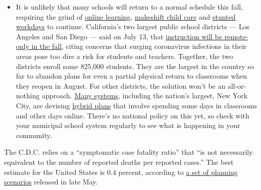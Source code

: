 \begin{itemize}
  \begin{itemize}
  \tightlist
  \item
    It is unlikely that many schools will return to a normal schedule
    this fall, requiring the grind of
    \href{https://www.nytimes3xbfgragh.onion/2020/06/05/us/coronavirus-education-lost-learning.html?action=click\&pgtype=Article\&state=default\&region=MAIN_CONTENT_3\&context=storylines_faq}{online
    learning},
    \href{https://www.nytimes3xbfgragh.onion/2020/05/29/us/coronavirus-child-care-centers.html?action=click\&pgtype=Article\&state=default\&region=MAIN_CONTENT_3\&context=storylines_faq}{makeshift
    child care} and
    \href{https://www.nytimes3xbfgragh.onion/2020/06/03/business/economy/coronavirus-working-women.html?action=click\&pgtype=Article\&state=default\&region=MAIN_CONTENT_3\&context=storylines_faq}{stunted
    workdays} to continue. California's two largest public school
    districts --- Los Angeles and San Diego --- said on July 13, that
    \href{https://www.nytimes3xbfgragh.onion/2020/07/13/us/lausd-san-diego-school-reopening.html?action=click\&pgtype=Article\&state=default\&region=MAIN_CONTENT_3\&context=storylines_faq}{instruction
    will be remote-only in the fall}, citing concerns that surging
    coronavirus infections in their areas pose too dire a risk for
    students and teachers. Together, the two districts enroll some
    825,000 students. They are the largest in the country so far to
    abandon plans for even a partial physical return to classrooms when
    they reopen in August. For other districts, the solution won't be an
    all-or-nothing approach.
    \href{https://bioethics.jhu.edu/research-and-outreach/projects/eschool-initiative/school-policy-tracker/}{Many
    systems}, including the nation's largest, New York City, are
    devising
    \href{https://www.nytimes3xbfgragh.onion/2020/06/26/us/coronavirus-schools-reopen-fall.html?action=click\&pgtype=Article\&state=default\&region=MAIN_CONTENT_3\&context=storylines_faq}{hybrid
    plans} that involve spending some days in classrooms and other days
    online. There's no national policy on this yet, so check with your
    municipal school system regularly to see what is happening in your
    community.
  \end{itemize}
\end{itemize}

The C.D.C. relies on a ``symptomatic case fatality ratio'' that ``is not
necessarily equivalent to the number of reported deaths per reported
cases.'' The best estimate for the United States is 0.4 percent,
according to
\href{https://www.cdc.gov/coronavirus/2019-ncov/hcp/planning-scenarios.html}{a
set of planning scenarios} released in late May.

